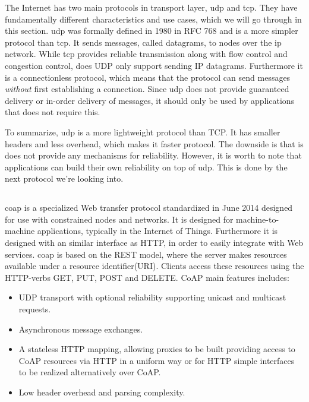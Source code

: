 The Internet has two main protocols in transport layer, \gls{udp} and \gls{tcp}.
They have fundamentally different characteristics and use cases, which we will
go through in this section. \gls{udp} was formally defined in 1980 in RFC
768\cite{rfc-udp} and is a more simpler protocol than \gls{tcp}. It sends
messages, called datagrams, to nodes over the \gls{ip} network. While \gls{tcp}
provides reliable transmission along with flow control and congestion control,
does UDP only support sending IP datagrams. Furthermore it is a connectionless
protocol, which means that the protocol can send messages \textit{without} first
establishing a connection. Since \gls{udp} does not provide guaranteed delivery
or in-order delivery of messages, it should only be used by applications that
does not require this.

To summarize, \gls{udp} is a more lightweight protocol than TCP. It has smaller
headers and less overhead, which makes it faster protocol. The downside is that
is does not provide any mechanisms for reliability. However, it is worth to note
that applications can build their own reliability on top of \gls{udp}. This is
done by the next protocol we're looking into.

\subsection{}

\gls{coap} is a specialized Web transfer protocol standardized in June 2014
designed for use with constrained nodes and  networks\cite{rfc-7252}. It is
designed for machine-to-machine applications, typically in the Internet of
Things. Furthermore it is designed with an similar interface as HTTP, in order
to easily integrate with Web services. \gls{coap} is based on the REST model,
where the server makes resources available  under a resource identifier(URI).
Clients access these resources using the HTTP-verbs GET, PUT, POST and DELETE.
CoAP main features includes:

\begin{itemize}

    \item UDP transport with optional reliability supporting unicast and
    multicast requests.

    \item Asynchronous message exchanges.

    \item A stateless HTTP mapping, allowing proxies to be built providing
    access to CoAP resources via HTTP in a uniform way or for HTTP simple
    interfaces to be realized alternatively over CoAP.

     \item Low header overhead and parsing complexity.

\end{itemize}

